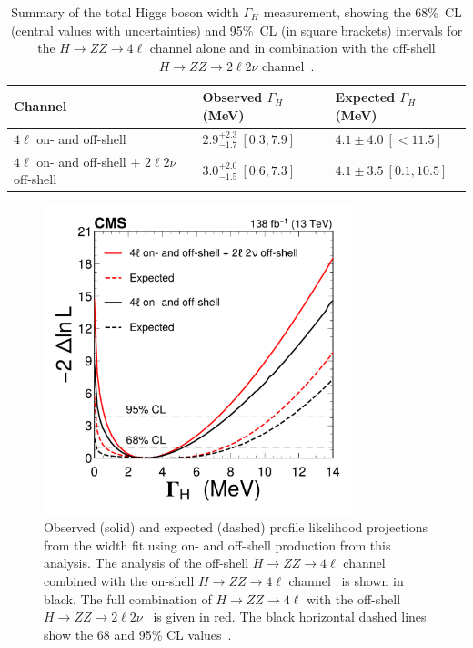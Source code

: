 \begin{table}[!hbt]
    \centering
    \begin{tabular}{lll}
        Channel     & Observed $\Gamma_H$ (MeV)        &  Expected $\Gamma_H$ (MeV)  \\
        \hline
        $4\ell$ on- and off-shell    & $2.9^{+2.3}_{-1.7} \ [0.3,7.9]$ & $4.1\pm 4.0 \ [<11.5 ]$ \\
        $4\ell$ on- and off-shell  + $2\ell2\nu$ off-shell  & $3.0^{+ 2.0 }_{- 1.5 }  \ [0.6, 7.3]$ & $4.1\pm3.5 \ [0.1,10.5]$ \\
    \end{tabular}
    \caption{Summary of the total Higgs boson width $\Gamma_H$ measurement, showing the 68\%~CL (central values with uncertainties)
    and 95\%~CL (in square brackets) intervals for the $H \to ZZ \to 4 \ell$ channel alone and in combination with the off-shell $H \to ZZ \to 2 \ell 2 \nu$ channel~\cite{PhysRevD.111.092014}.}
    \label{table:widthoffshellcomb}
\end{table}

\begin{figure}[!hbt]
    \centering
    \includegraphics[width=0.8\textwidth]{figures/Figure_011.pdf}  
    \caption{
        Observed (solid) and expected (dashed) profile likelihood projections from the \Hboson width fit using on- and off-shell production from this analysis. The analysis of the off-shell $H\to ZZ\to4\ell$ channel combined with the on-shell $H\to ZZ\to4\ell$ channel~\cite{CMS:2021nnc} is shown in black. The full combination of $H\to ZZ\to4\ell$ with the off-shell $H\to ZZ\to2\ell2\nu$~\cite{CMS:2022ley} is given in red. The black horizontal dashed lines show the 68 and 95\% CL values~\cite{PhysRevD.111.092014}.}
    \label{fig:widthscan} 
\end{figure}

